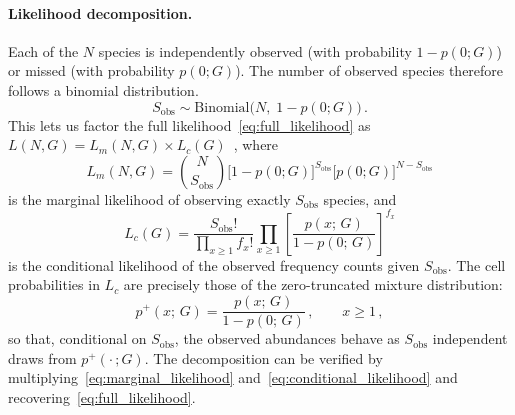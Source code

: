 ﻿\documentclass{article}
\begin{document}
\paragraph{Likelihood decomposition.}
Each of the $N$ species is independently observed (with probability $1 - p(0;G)$) or missed (with probability $p(0;G)$). The number of observed species therefore follows a binomial distribution.
\[
S_{\mathrm{obs}} \sim \mathrm{Binomial}\bigl(N,\; 1 - p(0;G)\bigr)\,.
\]
This lets us factor the full likelihood~\eqref{eq:full_likelihood} as $L(N,G) = L_m(N,G) \times L_c(G)$~\cite{sanathanan1972}, where
\begin{equation}\label{eq:marginal_likelihood}
    L_m(N,G) = \binom{N}{S_{\mathrm{obs}}} 
    \bigl[1 - p(0;G)\bigr]^{S_{\mathrm{obs}}} 
    \bigl[p(0;G)\bigr]^{N - S_{\mathrm{obs}}}
\end{equation}
is the marginal likelihood of observing exactly $S_{\mathrm{obs}}$ species, and
\begin{equation}\label{eq:conditional_likelihood}
    L_c(G) = \frac{S_{\mathrm{obs}}!}{\displaystyle\prod_{x \geq 1} f_x!} 
    \prod_{x \geq 1} \left[\frac{p(x;\, G)}{1 - p(0;\, G)}\right]^{f_x}
\end{equation}
is the conditional likelihood of the observed frequency counts given $S_{\mathrm{obs}}$. The cell probabilities in $L_c$ are precisely those of the zero-truncated mixture distribution:
\begin{equation}\label{eq:zero_truncated}
    p^+(x;\, G) = \frac{p(x;\, G)}{1 - p(0;\, G)}\,, \qquad x \geq 1\,,
\end{equation}
so that, conditional on $S_{\mathrm{obs}}$, the observed abundances behave as $S_{\mathrm{obs}}$ independent draws from $p^+(\cdot\,; G)$. The decomposition can be verified by multiplying~\eqref{eq:marginal_likelihood} and~\eqref{eq:conditional_likelihood} and recovering~\eqref{eq:full_likelihood}.
\end{document}

